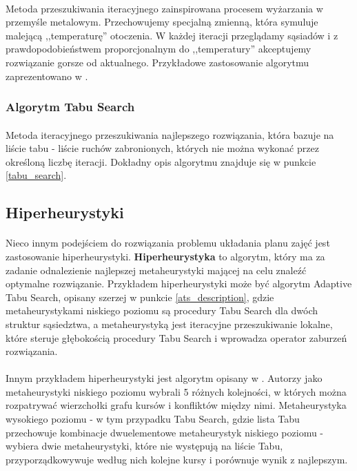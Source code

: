 \paragraph{} Metoda przeszukiwania iteracyjnego zainspirowana procesem wyżarzania w przemyśle metalowym. Przechowujemy specjalną zmienną, która symuluje malejącą ,,temperaturę'' otoczenia. W każdej iteracji przeglądamy sąsiadów i z prawdopodobieństwem proporcjonalnym do ,,temperatury'' akceptujemy rozwiązanie gorsze od aktualnego. Przykładowe zastosowanie algorytmu zaprezentowano w \cite{simulated_annealing} .


\subsubsection{Algorytm Tabu Search}
\paragraph{} Metoda iteracyjnego przeszukiwania najlepszego rozwiązania, która bazuje na liście tabu - liście ruchów zabronionych, których nie można wykonać przez określoną liczbę iteracji. Dokładny opis algorytmu znajduje się w punkcie \ref{tabu_search}.

\subsection{Hiperheurystyki}
\paragraph{}Nieco innym podejściem do rozwiązania problemu układania planu zajęć jest zastosowanie hiperheurystyki. \textbf{Hiperheurystyka} \cite{hyperheuristic} to algorytm, który ma za zadanie odnalezienie najlepszej metaheurystyki mającej na celu znaleźć optymalne rozwiązanie. Przykładem hiperheurystyki może być algorytm Adaptive Tabu Search, opisany szerzej w punkcie \ref{ats_description}, gdzie metaheurystykami niskiego poziomu są procedury Tabu Search dla dwóch struktur sąsiedztwa, a metaheurystyką jest iteracyjne przeszukiwanie lokalne, które steruje głębokością procedury Tabu Search i wprowadza operator zaburzeń rozwiązania.
\paragraph{}Innym przykładem hiperheurystyki jest algorytm opisany w \cite{gbhh}. Autorzy jako metaheurystyki niskiego poziomu wybrali 5 różnych kolejności, w których można rozpatrywać wierzchołki grafu kursów i konfliktów między nimi. Metaheurystyka wysokiego poziomu - w tym przypadku Tabu Search, gdzie lista Tabu przechowuje kombinacje dwuelementowe metaheurystyk niskiego poziomu - wybiera dwie metaheurystyki, które nie występują na liście Tabu, przyporządkowywuje według nich kolejne kursy i porównuje wynik z najlepszym.

